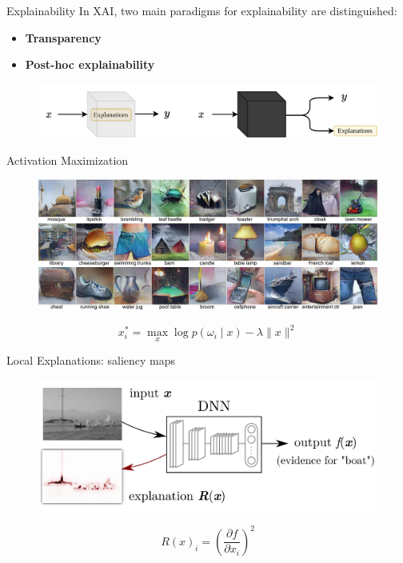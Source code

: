 \documentclass{beamer}
\begin{document}
\begin{frame}{Explainability}
	In XAI, two main paradigms for explainability are distinguished: 
	\begin{itemize}
		\item \textbf{Transparency}
		\item \textbf{Post-hoc explainability}
	\end{itemize}
	\begin{figure}
		\includegraphics[width=\linewidth]{images/trasparency_vs_posthoc.png}
	\end{figure}
\end{frame}

\begin{frame}{Activation Maximization}
	\begin{figure}
		\includegraphics[width=\linewidth]{images/activation_maximization.png}
	\end{figure}
\begin{equation*}
x_{i}^{*}=\max _{x} \log p\left(\omega_{i} \mid x\right)-\lambda\|x\|^{2}
\end{equation*}
\end{frame}

\begin{frame}{Local Explanations: saliency maps}
	\begin{figure}
		\includegraphics[width=0.8\linewidth]{images/explanation_map_nn.png}
	\end{figure}
	\begin{equation*}
	R(x)_{i}=\left(\frac{\partial f}{\partial x_{i}}\right)^{2}
	\end{equation*}
\end{frame}
\end{document}
